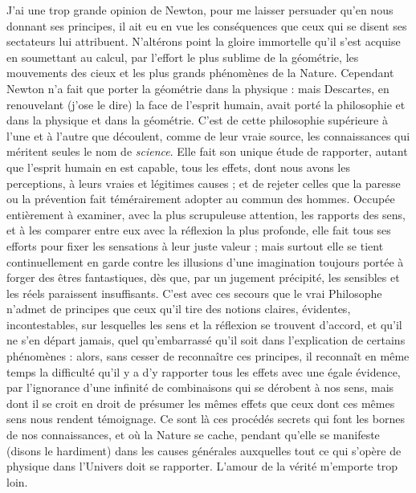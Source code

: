 \documentclass[a4paper, 11pt, oneside, polutonikogreek, french]{article}
\begin{document}
J'ai une trop grande opinion de Newton, pour me laisser persuader qu'en nous donnant ses principes, il ait eu en vue les conséquences que ceux qui se disent ses sectateurs lui attribuent. N'altérons point la gloire immortelle qu'il s'est acquise en soumettant au calcul, par l'effort le plus sublime de la géométrie, les mouvements des cieux et les plus grands phénomènes de la Nature. Cependant Newton n'a fait que porter la géométrie dans la physique : mais Descartes, en renouvelant (j'ose le dire) la face de l'esprit humain, avait porté la philosophie et dans la physique et dans la géométrie. C'est de cette philosophie supérieure à l'une et à l'autre que découlent, comme de leur vraie source, les connaissances qui méritent seules le nom de \emph{science}. Elle fait son unique étude de rapporter, autant que l'esprit humain en est capable, tous les effets, dont nous avons les perceptions, à leurs vraies et légitimes causes ; et de rejeter celles que la paresse ou la prévention fait témérairement adopter au commun des hommes. Occupée entièrement à examiner, avec la plus scrupuleuse attention, les rapports des sens, et à les comparer entre eux avec la réflexion la plus profonde, elle fait tous ses efforts pour fixer les sensations à leur juste valeur ; mais surtout elle se tient continuellement en garde contre les illusions d'une imagination toujours portée à forger des êtres fantastiques, dès que, par un jugement précipité, les sensibles et les réels paraissent insuffisants. C'est avec ces secours que le vrai Philosophe n'admet de principes que ceux qu'il tire des notions claires, évidentes, incontestables, sur lesquelles les sens et la réflexion se trouvent d'accord, et qu'il ne s'en départ jamais, quel qu’embarrassé qu'il soit dans l'explication de certains phénomènes : alors, sans cesser de reconnaître ces principes, il reconnaît en même temps la difficulté qu'il y a d'y rapporter tous les effets avec une égale évidence, par l'ignorance d'une infinité de combinaisons qui se dérobent à nos sens, mais dont il se croit en droit de présumer les mêmes effets que ceux dont ces mêmes sens nous rendent témoignage. Ce sont là ces procédés secrets qui font les bornes de nos connaissances, et où la Nature se cache, pendant qu'elle se manifeste (disons le hardiment) dans les causes générales auxquelles tout ce qui s'opère de physique dans l'Univers doit se rapporter. L'amour de la vérité m'emporte trop loin.
\end{document}
